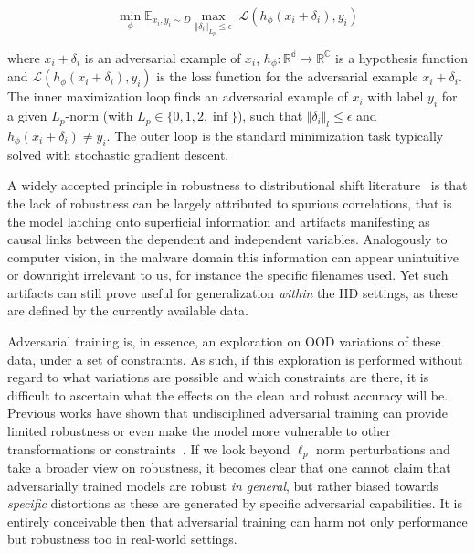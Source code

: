\begin{equation}
    \underset{\phi}{\operatorname{min}} \mathbb{E}_{x_i, y_i\sim D} \underset{\Vert \delta_i \Vert_{L_p} \leq \epsilon}{\operatorname{max}} \; \mathcal{L}(h_{\phi}(x_i + \delta_i), y_i)
\label{eqn:adv_trainauto}
\end{equation}

\noindent where $x_i + \delta_i$ is an adversarial example of $x_i$, $h_\phi : \mathbb{R^d} \rightarrow \mathbb{R^C}$ is a hypothesis function and $\mathcal{L}(h_\phi(x_i + \delta_i), y_i)$ is the loss function for the adversarial example $x_i + \delta_i$.
The inner maximization loop finds an adversarial example of $x_i$ with label $y_i$ for a given $L_p$-norm (with $L_p \in \{0,1,2,\inf\}$), such that $\Vert \delta_i\Vert_{l} \leq \epsilon$ and $h_\phi(x_i + \delta_i) \neq y_i$.
The outer loop is the standard minimization task typically solved with stochastic gradient descent.

A widely accepted principle in robustness to distributional shift literature~\cite{lanckriet2002robust, geirhos2018generalisation} is that the lack of robustness can be largely attributed to spurious correlations, that is the model latching onto superficial information and artifacts manifesting as causal links between the dependent and independent variables.
Analogously to computer vision, in the malware domain this information can appear unintuitive or downright irrelevant to us, for instance the specific filenames used.
Yet such artifacts can still prove useful for generalization \textit{within} the \gls{IID} settings, as these are defined by the currently available data.

Adversarial training is, in essence, an exploration on \gls{OOD} variations of these data, under a set of constraints.
As such, if this exploration is performed without regard to what variations are possible and which constraints are there, it is difficult to ascertain what the effects on the clean and robust accuracy will be.
Previous works have shown that undisciplined adversarial training can provide limited robustness or even make the model more vulnerable to other transformations or constraints~\cite{hendrycks2019benchmarking, dyrmishi2023empirical}.
If we look beyond $\ell_p$ norm perturbations and take a broader view on robustness, it becomes clear that one cannot claim that adversarially trained models are robust \emph{in general}, but rather biased towards \textit{specific} distortions as these are generated by specific adversarial capabilities. 
It is entirely conceivable then that adversarial training can harm not only performance but robustness too in real-world settings.

